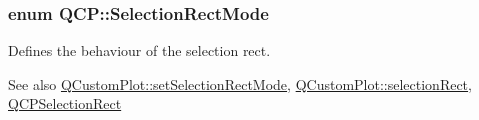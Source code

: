 \subsubsection[{\texorpdfstring{Selection\+Rect\+Mode}{SelectionRectMode}}]{\setlength{\rightskip}{0pt plus 5cm}enum {\bf Q\+C\+P\+::\+Selection\+Rect\+Mode}}\hypertarget{namespaceQCP_ac9aa4d6d81ac76b094f9af9ad2d3aacf}{}\label{namespaceQCP_ac9aa4d6d81ac76b094f9af9ad2d3aacf}
Defines the behaviour of the selection rect.

\begin{DoxySeeAlso}{See also}
\hyperlink{classQCustomPlot_a810ef958ebe84db661c7288b526c0deb}{Q\+Custom\+Plot\+::set\+Selection\+Rect\+Mode}, \hyperlink{classQCustomPlot_ae64a3994735d8f592a60d9430526a163}{Q\+Custom\+Plot\+::selection\+Rect}, \hyperlink{classQCPSelectionRect}{Q\+C\+P\+Selection\+Rect} 
\end{DoxySeeAlso}
